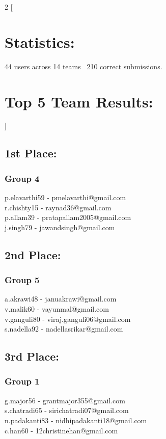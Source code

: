 \documentclass{article}
\title{}
\author{CTF REPORT}
\date{07/12/23}
\begin{document}
    \maketitle

    \begin{multicols}{2}
    [
    \section*{Statistics:} %
    44 users across 14 teams \
    210 correct submissions.
    \section*{Top 5 Team Results:}
    ]

    \subsection*{1st Place:}
    \subsubsection*{Group 4}
    p.elavarthi59 - pmelavarthi@gmail.com \\ r.chishty15 - raynad36@gmail.com \\ p.allam39 - pratapallam2005@gmail.com \\ j.singh79 - jawandsingh@gmail.com
    \subsection*{2nd Place:}
    \subsubsection*{Group 5}
    a.akrawi48 - januakrawi@gmail.com \\ v.malik60 - vayunmal@gmail.com \\ v.ganguli80 - viraj.ganguli06@gmail.com \\ s.nadella92 - nadellasrikar@gmail.com
    \subsection*{3rd Place:}
    \subsubsection*{Group 1}
    g.major56 - grantmajor355@gmail.com \\ s.chatradi65 - sirichatradi07@gmail.com \\ n.padakanti83 - nidhipadakanti18@gmail.com \\ c.han60 - 12christinehan@gmail.com


\end{multicols}
\end{document}
